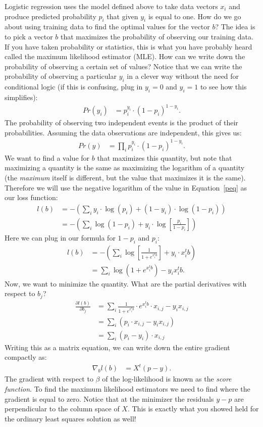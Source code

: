 \documentclass[12pt,hidelinks]{article}
\numberwithin{equation}{section}
\begin{document}
Logistic regression uses the model defined above to take data vectors $x_i$
and produce predicted probability $p_i$ that given $y_i$ is equal to one. How
do we go about using training data to find the optimal values for the vector
$b$? The idea is to pick a vector $b$ that maximizes the probability
of observing our training data. If you have taken probability or statistics,
this is what you have probably heard called the maximum likelihood estimator
(MLE). How can we write down the probability of observing a certain set of
values? Notice that we can write the probability of observing a particular
$y_i$ in a clever way without the need for conditional logic (if this is
confusing, plug in $y_i=0$ and $y_i=1$ to see how this simplifies):
\begin{align}
Pr(y_i) &= p_i^{y_i} \cdot (1 - p_i)^{1 - y_i}.
\end{align}
The probability of observing two independent events is the product of their
probabilities. Assuming the data observations are independent, this gives us:
\begin{align}
Pr(y) &= \prod_i p_i^{y_i} \cdot (1 - p_i)^{1 - y_i}. \label{peq}
\end{align}
We want to find a value for $b$ that maximizes this quantity, but note
that maximizing a quantity is the same as maximizing the logarithm of a quantity
(the \textit{maximum} itself is different, but the value that maximizes it is
the same). Therefore we will use the negative logarithm of the value in
Equation~\ref{peq} as our loss function:
\begin{align}
l(b) &= - \left( \sum_i y_i \cdot \log(p_i) + (1 - y_i) \cdot \log(1 - p_i) \right) \\
&= - \left( \sum_i \log(1 - p_i) + y_i \cdot \log\left[ \frac{p_i}{1 - p_i} \right] \right)
\end{align}
Here we can plug in our formula for $1-p_i$ and $p_i$:
\begin{align}
l(b) &= - \left( \sum_i \log\left[ \frac{1}{1 + e^{x_i^t b}} \right]
+ y_i \cdot x_i^t b \right) \\
&= \sum_i \log(1 + e^{x_i^t b}) - y_i x_i^t b.
\end{align}
Now, we want to minimize the quantity. What are the partial derivatives with
respect to $b_j$?
\begin{align}
\frac{\partial l(b)}{\partial b_j} &= \sum_i \frac{1}{1 + e^{x_i^t b}} \cdot
e^{x_i^t b} \cdot x_{i,j} - y_i x_{i, j} \\
&= \sum_i \left( p_i \cdot x_{i,j} - y_i x_{i, j} \right) \\
&= \sum_i \left( p_i - y_i \right) \cdot x_{i,j}
\end{align}
Writing this as a matrix equation, we can write down the entire gradient
compactly as:
\begin{align}
\nabla_b l(b) &= X^t (p - y).
\end{align}
The gradient with respect to $\beta$ of the log-likelihood is known as
the \textit{score function}.
To find the maximum likelihood estimators we
need to find where the gradient is equal to zero. Notice that at the minimizer
the residuals $y - p$ are perpendicular to the column space of $X$. This is
exactly what you showed held for the ordinary least squares solution as
well!
\end{document}
